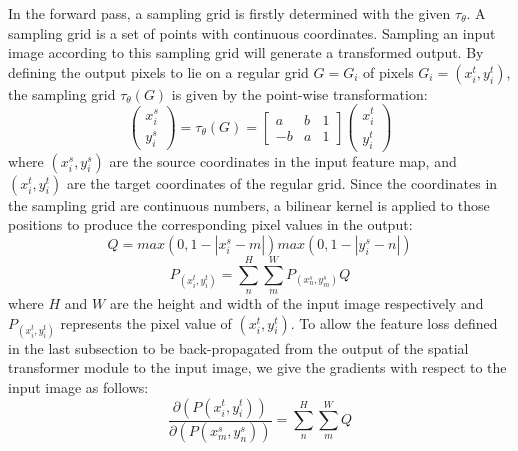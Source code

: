 \documentclass[10pt,twocolumn,letterpaper]{article}
\begin{document}



In the forward pass, a sampling grid is firstly determined with the given $\tau_\theta$. A sampling grid is a set of points with continuous coordinates. Sampling an input image according to this sampling grid will generate a transformed output.
 By defining the output pixels to lie on a regular grid $G = {G_i}$ of pixels $G_i = (x_i^{t},y_i^{t})$, the sampling grid $\tau_\theta(G)$ is given by the point-wise transformation:
\begin{equation}
\left( \begin{array}{l}
x_i^{s}\\
y_i^{s}
\end{array} \right) = {\tau _\theta }(G) = \left[{\begin{array}{*{20}{c}}
a&b&1\\
{ - b}&a&1
\end{array}} \right]\left( \begin{array}{l}
x_i^{t}\\
y_i^{t}
\end{array} \right)
\end{equation}
where $(x_i^{s}, y_i^{s})$ are the source coordinates in the input feature map, and $(x_i^{t}, y_i^{t})$ are the target coordinates of the regular grid. Since the coordinates in the sampling grid are continuous numbers, a bilinear kernel is applied to those positions to produce the corresponding pixel values in the output:
\begin{equation}
Q = max(0,1 - \left| {x_i^{s} - m} \right|)max(0,1 - \left| {y_i^{s} - n} \right|)
\end{equation}
\begin{equation}
P_{(x_i^{t},y_i^{t})}= \sum\limits_n^H {\sum\limits_m^W {P_{(x_n^{s},y_m^{s})}Q} }
\end{equation}
where $H$ and $W$ are the height and width of the input image respectively and $P_{(x_i^{t},y_i^{t})}$ represents the pixel value of $(x_i^{t},y_i^{t})$. To allow the feature loss defined in the last subsection to be back-propagated from the output of the spatial transformer module to the input image, we give the gradients with respect to the input image as follows:
\begin{equation}
\frac{{\partial (P(x_i^t,y_i^t))}}{{\partial (P(x_m^s,y_n^s))}} =\sum\limits_n^H {\sum\limits_m^W {Q} }\label{eq:bp}
\end{equation}
\end{document}
